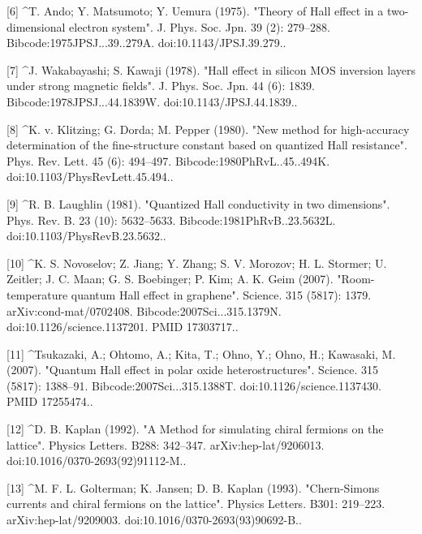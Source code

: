 [6]
^T. Ando; Y. Matsumoto; Y. Uemura (1975). "Theory of Hall effect in a two-dimensional electron system". J. Phys. Soc. Jpn. 39 (2): 279–288. Bibcode:1975JPSJ...39..279A. doi:10.1143/JPSJ.39.279..

[7]
^J. Wakabayashi; S. Kawaji (1978). "Hall effect in silicon MOS inversion layers under strong magnetic fields". J. Phys. Soc. Jpn. 44 (6): 1839. Bibcode:1978JPSJ...44.1839W. doi:10.1143/JPSJ.44.1839..

[8]
^K. v. Klitzing; G. Dorda; M. Pepper (1980). "New method for high-accuracy determination of the fine-structure constant based on quantized Hall resistance". Phys. Rev. Lett. 45 (6): 494–497. Bibcode:1980PhRvL..45..494K. doi:10.1103/PhysRevLett.45.494..

[9]
^R. B. Laughlin (1981). "Quantized Hall conductivity in two dimensions". Phys. Rev. B. 23 (10): 5632–5633. Bibcode:1981PhRvB..23.5632L. doi:10.1103/PhysRevB.23.5632..

[10]
^K. S. Novoselov; Z. Jiang; Y. Zhang; S. V. Morozov; H. L. Stormer; U. Zeitler; J. C. Maan; G. S. Boebinger; P. Kim; A. K. Geim (2007). "Room-temperature quantum Hall effect in graphene". Science. 315 (5817): 1379. arXiv:cond-mat/0702408. Bibcode:2007Sci...315.1379N. doi:10.1126/science.1137201. PMID 17303717..

[11]
^Tsukazaki, A.; Ohtomo, A.; Kita, T.; Ohno, Y.; Ohno, H.; Kawasaki, M. (2007). "Quantum Hall effect in polar oxide heterostructures". Science. 315 (5817): 1388–91. Bibcode:2007Sci...315.1388T. doi:10.1126/science.1137430. PMID 17255474..

[12]
^D. B. Kaplan (1992). "A Method for simulating chiral fermions on the lattice". Physics Letters. B288: 342–347. arXiv:hep-lat/9206013. doi:10.1016/0370-2693(92)91112-M..

[13]
^M. F. L. Golterman; K. Jansen; D. B. Kaplan (1993). "Chern-Simons currents and chiral fermions on the lattice". Physics Letters. B301: 219–223. arXiv:hep-lat/9209003. doi:10.1016/0370-2693(93)90692-B..